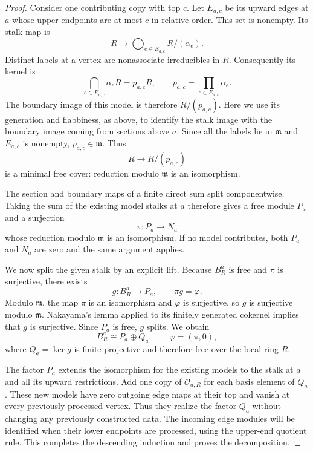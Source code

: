 \begin{proof}
Consider one contributing copy with top $c$.  Let $E_{a,c}$ be its
upward edges at $a$ whose upper endpoints are at most $c$ in relative
order.  This set is nonempty.  Its stalk map is
\[
 R\longrightarrow\bigoplus_{e\in E_{a,c}}R/(\alpha_e).
\]
Distinct labels at a vertex are nonassociate irreducibles in $R$.
Consequently its kernel is
\begin{equation}
\label{loc:boundary-product}
 \bigcap_{e\in E_{a,c}}\alpha_eR
  =p_{a,c}R,
 \qquad
 p_{a,c}=\prod_{e\in E_{a,c}}\alpha_e.
\end{equation}
The boundary image of this model is therefore $R/(p_{a,c})$.
Here we use its generation and flabbiness, as above, to identify the
stalk image with the boundary image coming from sections above $a$.
Since all the labels lie in $\mathfrak m$ and $E_{a,c}$ is nonempty,
$p_{a,c}\in\mathfrak m$.
Thus
\[
 R\longrightarrow R/(p_{a,c})
\]
is a minimal free cover: reduction modulo $\mathfrak m$ is an
isomorphism.

The section and boundary maps of a finite direct sum split componentwise.
Taking the sum of the existing model stalks at $a$ therefore gives a free
module $P_a$ and a surjection
\[
 \pi:P_a\longrightarrow N_a
\]
whose reduction modulo $\mathfrak m$ is an isomorphism.
If no model contributes, both $P_a$ and $N_a$ are zero and the same
argument applies.

We now split the given stalk by an explicit lift.
Because $B_R^a$ is free and $\pi$ is surjective, there exists
\[
 g:B_R^a\longrightarrow P_a,
 \qquad \pi g=\varphi.
\]
Modulo $\mathfrak m$, the map $\pi$ is an isomorphism and
$\varphi$ is surjective, so $g$ is surjective modulo $\mathfrak m$.
Nakayama's lemma applied to its finitely generated cokernel implies
that $g$ is surjective.  Since $P_a$ is free, $g$ splits.  We obtain
\[
 B_R^a\cong P_a\oplus Q_a,
 \qquad
 \varphi=(\pi,0),
\]
where $Q_a=\ker g$ is finite projective and therefore free over the
local ring $R$.

The factor $P_a$ extends the isomorphism for the existing models to
the stalk at $a$ and all its upward restrictions.  Add one copy of
$\mathcal O_{a,R}$ for each basis element of $Q_a$.  These new models
have zero outgoing edge maps at their top and vanish at every previously
processed vertex.  Thus they realize the factor $Q_a$ without changing
any previously constructed data.  The incoming edge modules will be
identified when their lower endpoints are processed, using the
upper-end quotient rule.
This completes the descending induction and proves the decomposition.
\end{proof}

